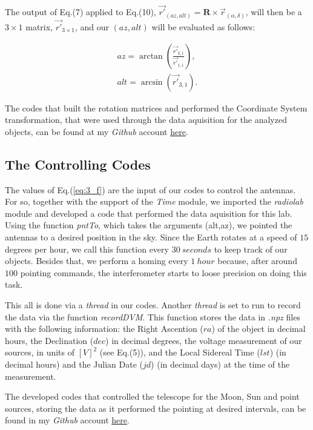 \documentclass{article}
\begin{document}
The output of Eq.(7) applied to Eq.(10), $\vec{r'}_{(az,alt)}=\textbf{R} \times
\vec{r}_{(\alpha,\delta)}$, will then be a $3 \times 1$ matrix,
$\vec{r'}_{3 \times 1}$, and our $(az,alt)$ will be evaluated as
follows:

\begin{equation}
\begin{gathered}
az = \arctan{\left(\frac{\vec{r'}_{2,1}}{\vec{r'}_{1,1}}\right)}, \\
alt = \arcsin{(\vec{r'}_{3,1})}.
\end{gathered}
\label{eq:3_f}
\end{equation} 

The codes that built the rotation matrices and performed the
Coordinate System
transformation, that were used through the data aquisition for the analyzed objects, can be found at my \emph{Github} account \href{https://github.com/leosattler/ugradio/tree/master/lab_interf}
{here}.

\subsection{The Controlling Codes} 

The values of Eq.(\ref{eq:3_f}) are the input of our codes to control
the antennas. For so, together with the support of the \emph{Time}
module, we imported the \emph{radiolab} module and developed a code that
performed the data aquisition for this lab. Using the
function \emph{pntTo}, which takes the arguments (alt,az), we pointed
the antennas to a desired position in the sky. Since the
Earth rotates at a speed of $15$ degrees per hour, we call this function
every $30 \ seconds$ to keep track of our objects. Besides that, we perform a homing every $1 \
hour$ because, after around $100$ pointing commands, the interferometer starts to
loose precision on doing this task. 

This all is done via a \emph{thread} in our codes. Another \emph{thread}
is set to run to record the data via the function \emph{recordDVM}. This
function stores the data in \emph{.npz} files with the following information: the Right Ascention ($ra$)
of the object in decimal hours, the Declination ($dec$) in
decimal degrees, the
voltage measurement of our sources, in units of $[V]^{2}$ (see Eq.(5)),
and the Local Sidereal Time ($lst$) (in decimal hours)  
and the Julian Date ($jd$) (in decimal days) at the time of the measurement.

The developed codes that controlled the telescope for the Moon, Sun and
point sources, storing the data as it performed the pointing at
desired intervals, can be found in my \emph{Github} account
\href{https://github.com/leosattler/ugradio/tree/master/lab_interf}{here}. 
\end{document}
